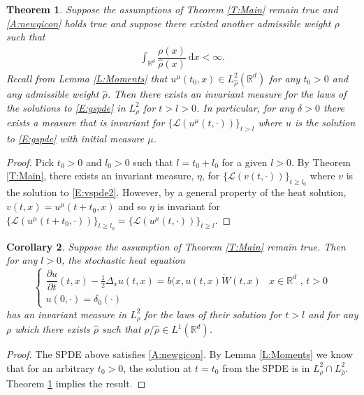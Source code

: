 \documentclass[a4paper,11pt]{article}
\numberwithin{equation}{section}
\theoremstyle{plain}
\newtheorem{theorem}{Theorem}[section]
\newtheorem{corollary}[theorem]{Corollary}
\theoremstyle{definition}
\newcommand{\R}{\mathbb{R}}
\newcommand{\ud}{\ensuremath{\mathrm{d}}}
\begin{document}
\begin{theorem} 
	\label{T:Main2}
	Suppose the assumptions of Theorem \ref{T:Main} remain true and \eqref{A:newgicon} holds true and suppose there existed
	another admissible weight $\hat{\rho}$ such that 
	\begin{align*}
		\int_{\R^d}\dfrac{\rho(x)}{\hat\rho(x)}\: \ud x < \infty.   	
	\end{align*}
	Recall from Lemma \ref{L:Moments} that $u^\mu(t_0,x) \in L^2_{\hat\rho}(\R^d)$ for any $t_0 >0$ and any
	admissible weight $\hat{\rho}$. Then there exists an invariant measure for the laws of the solutions to
	\eqref{E:gspde} in $L^2_\rho$ for $t>l>0$. In particular, for any $\delta>0$ there exists a measure that is
	invariant for $\{\mathscr L (u^\mu(t,\cdot))\}_{t>l}$ where $u$ is the solution to \eqref{E:gspde} with
	initial measure $\mu$.
\end{theorem}

\begin{proof} Pick $t_0>0$ and $l_0>0$ such that $l=t_0+l_0$ for a given $l >0$.  By Theorem
\ref{T:Main}, there exists an invariant measure, $\eta$, for $\{\mathscr L(v(t,\cdot))\}_{t\ge l_0}$ where $v$ is
the solution to \eqref{E:vspde2}. However, by a general property of the heat solution, $v(t,x)=u^\mu(t+t_0,x)$ and so
$\eta$ is invariant for $\{\mathscr L(u^\mu(t+t_0,\cdot))\}_{t\ge l_0} = \{\mathscr L(u^\mu(t,\cdot))\}_{t\ge
l}$. 
\end{proof}

\begin{corollary}
	\label{C:delta}
	Suppose the assumption of Theorem \ref{T:Main} remain true. Then for any $l>0$, the stochastic heat equation 
	\begin{equation}
		\label{E:dspde}
		\begin{cases}
		\dfrac{\partial u}{\partial t}(t,x)-\frac{1}{2}\Delta_x u(t,x) = b(x,u(t,x)\dot W(t,x) & \text{$x\in \R^d$ , $t>0$}
		\\ u(0,\cdot) = \delta_0(\cdot)  & 
		\end{cases}  
	\end{equation}
	has an invariant measure in $L^2_\rho$ for the laws of their solution for $t>l$ and for any $\rho$ which
	there exists $\hat{\rho}$ such that $\rho/\hat{\rho} \in L^1(\R^d)$.
\end{corollary}

\begin{proof} 
	The SPDE above satisfies \eqref{A:newgicon}. 
	By Lemma \ref{L:Moments} we know that for an arbitrary $t_0>0$, the solution at $t=t_0$ from the SPDE is in $L^2_\rho \cap L^2_{\hat\rho}$. Theorem \ref{T:Main2} implies the result. 
\end{proof}
\end{document}
